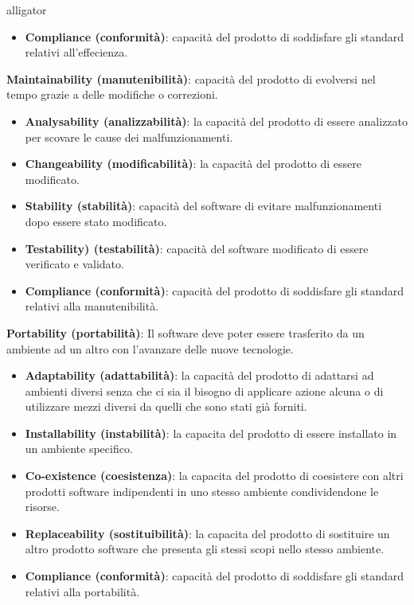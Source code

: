 \begin{labeling}{alligator}
\begin{itemize}
		\item \textbf{Compliance (conformità)}: capacità del prodotto di soddisfare gli standard relativi all'effecienza.
		
	\end{itemize}
	
	\item \textbf{Maintainability (manutenibilità)}: capacità del prodotto di evolversi nel tempo grazie a delle modifiche o correzioni.
	\begin{itemize}
		\item \textbf{Analysability (analizzabilità)}: la capacità del prodotto di essere analizzato per scovare le cause dei malfunzionamenti.
		
		\item \textbf{Changeability (modificabilità)}: la capacità del prodotto di essere modificato.
		
		\item \textbf{Stability (stabilità)}: capacità del software di evitare malfunzionamenti dopo essere stato modificato.
		
		\item \textbf{Testability) (testabilità)}: capacità del software modificato di essere verificato e validato.
		
		\item \textbf{Compliance (conformità)}: capacità del prodotto di soddisfare gli standard relativi alla manutenibilità.
	\end{itemize}
	
	\item \textbf{Portability (portabilità)}: Il software deve poter essere trasferito da un ambiente ad un altro con l'avanzare delle nuove tecnologie.
	\begin{itemize}
		\item \textbf{Adaptability (adattabilità)}: la capacità del prodotto di adattarsi ad ambienti diversi senza che ci sia il bisogno di applicare azione alcuna o di utilizzare mezzi diversi da quelli che sono stati già forniti. 
		
		\item \textbf{Installability (instabilità)}: la capacita del prodotto di essere installato in un ambiente specifico.
		
		\item \textbf{Co-existence (coesistenza)}: la capacita del prodotto di coesistere con altri prodotti software indipendenti in uno stesso ambiente condividendone le risorse.
		
		\item \textbf{Replaceability (sostituibilità)}: la capacita del prodotto di sostituire un altro prodotto software che presenta gli stessi scopi nello stesso ambiente. 
		
		\item \textbf{Compliance (conformità)}: capacità del prodotto di soddisfare gli standard relativi alla portabilità.
	\end{itemize}
\end{labeling}

